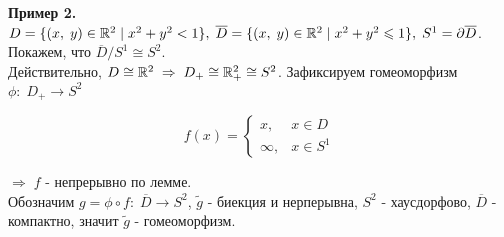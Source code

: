 \documentclass[../../main.tex]{subfiles}
\begin{document}
\textbf{Пример 2.} $D=\{(x,\;y)\in\mathbb{R}^2\;|\; x^2+y^2 < 1\},\; \overline D=\{(x,\;y)\in\mathbb{R}^2\;|\; x^2+y^2 \leqslant 1\},\; S^1 = \partial \overline D$. Покажем, что $\overline D/S^1 \cong S^2$.\\
Действительно, $D\cong \mathbb{R}^2\;\Rightarrow\; D_+\cong \mathbb{R}^2_+\cong S^2$. Зафиксируем гомеоморфизм $\phi:\;D_+\rightarrow S^2$\\
\begin{minipage}[]{0.25\linewidth}
\end{minipage}
\begin{minipage}[]{0.25\linewidth}
\begin{equation*}
    f(x) = \begin{cases}
    x, & x\in D\\
    \infty, & x\in S^1
    \end{cases}
\end{equation*}
\end{minipage} $\Rightarrow\;f$ - непрерывно по лемме.\\
Обозначим $g = \phi \circ f:\; \overline D\rightarrow S^2$, $\tilde g$ - биекция и нерперывна, $S^2$ - хаусдорфово, $\overline D$ - компактно, значит $\tilde g$ - гомеоморфизм.
\end{document}
